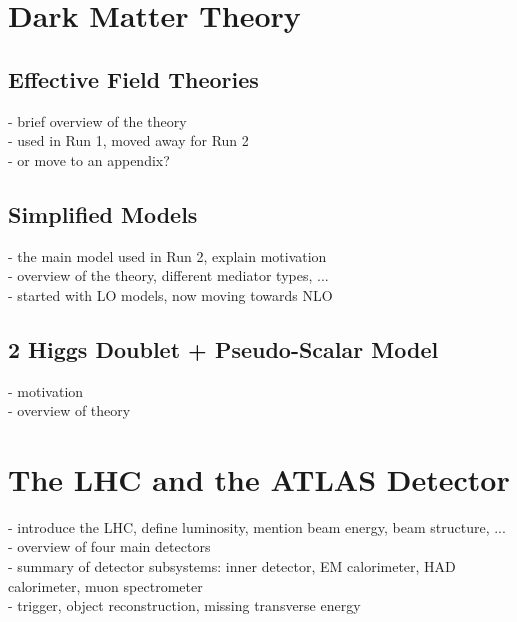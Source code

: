 \label{chapter:theory}

\section{Dark Matter Theory}

\subsection{Effective Field Theories}

- brief overview of the theory\\
- used in Run 1, moved away for Run 2\\
- or move to an appendix?\\

\subsection{Simplified Models}

- the main model used in Run 2, explain motivation\\
- overview of the theory, different mediator types, ...\\
- started with LO models, now moving towards NLO\\

\subsection{2 Higgs Doublet + Pseudo-Scalar Model}

- motivation\\
- overview of theory\\

\section{The LHC and the ATLAS Detector}

- introduce the LHC, define luminosity, mention beam energy, beam structure, ...\\
- overview of four main detectors\\
- summary of detector subsystems: inner detector, EM calorimeter, HAD calorimeter, muon spectrometer\\
- trigger, object reconstruction, missing transverse energy\\